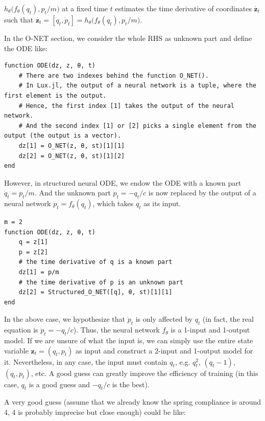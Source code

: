\documentclass[
	parskip, 			   %
	twoside, 			   %
	DIV=14, 			   %
	BCOR=15.0mm, 		   %
	headsepline, 		   %
	open=right, 		   %
	captions=tableheading, %
	bibliography=totoc,    %
	numbers=noenddot       %
]{scrreprt}
\begin{document}
$h_{\theta} \big(f_{\theta}(q_t), p_t/m \big)$ at a fixed time $t$ estimates the time derivative of coordinates $\dot{\mathbf{z}_{t}}$ such that $\dot{\mathbf{z}_{t}} = [\dot{q}_{t}, \dot{p}_{t}] = h_{\theta} \big(f_{\theta}(q_t), p_t/m \big)$.

In the O-NET section, we consider the whole RHS as unknown part and define the ODE like:
\begin{verbatim}
function ODE(dz, z, θ, t)
    # There are two indexes behind the function O_NET().
    # In Lux.jl, the output of a neural network is a tuple, where the first element is the output.
    # Hence, the first index [1] takes the output of the neural network.
    # And the second index [1] or [2] picks a single element from the output (the output is a vector).
    dz[1] = O_NET(z, θ, st)[1][1]
    dz[2] = O_NET(z, θ, st)[1][2]
end
\end{verbatim}

However, in structured neural ODE, we endow the ODE with a known part $\dot{q}_t = p_t/m$. And the unknown part $\dot{p}_t = -q_t/c$ is now replaced by the output of a neural network $\dot{p}_t = f_{\theta}(q_t)$, which takes $q_t$ as its input.

\begin{verbatim}
m = 2
function ODE(dz, z, θ, t)
    q = z[1]
    p = z[2]
    # the time derivative of q is a known part
    dz[1] = p/m
    # the time derivative of p is an unknown part
    dz[2] = Structured_O_NET([q], θ, st)[1][1]
end
\end{verbatim}

In the above case, we hypothesize that $\Dot{p}_t$ is only affected by $q_t$ (in fact, the real equation is $\dot{p}_t = -q_t/c$). Thus, the neural network $f_{\theta}$ is a 1-input and 1-output model. If we are unsure of what the input is, we can simply use the entire state variable $\mathbf{z}_t = (q_t, p_t)$ as input and construct a 2-input and 1-output model for it. Nevertheless, in any case, the input must contain $q_t$, e.g. $q_t^2$, $(q_t-1)$, $(q_t, p_t)$, etc. A good guess can greatly improve the efficiency of training (in this case, $q_t$ is a good guess and $-q_t/c$ is the best). 

A very good guess (assume that we already know the spring compliance is around 4, 4 is probably imprecise but close enough) could be like:
\end{document}
